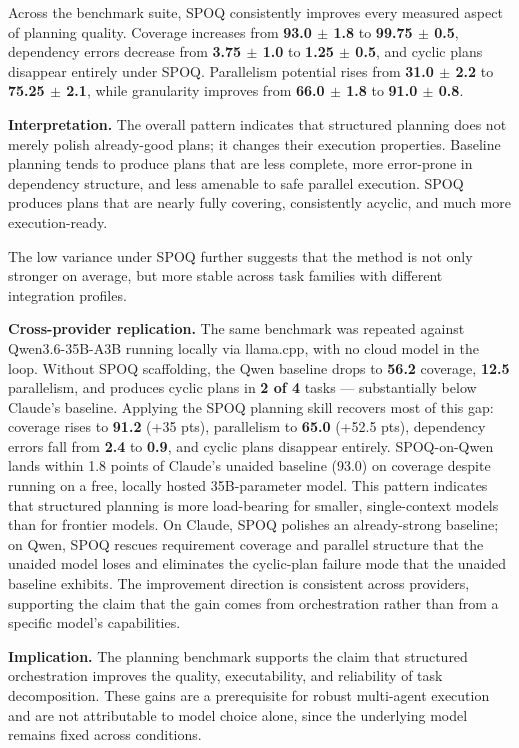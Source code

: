 Across the benchmark suite, SPOQ consistently improves every measured aspect of planning quality. Coverage increases from \textbf{93.0 $\pm$ 1.8} to \textbf{99.75 $\pm$ 0.5}, dependency errors decrease from \textbf{3.75 $\pm$ 1.0} to \textbf{1.25 $\pm$ 0.5}, and cyclic plans disappear entirely under SPOQ. Parallelism potential rises from \textbf{31.0 $\pm$ 2.2} to \textbf{75.25 $\pm$ 2.1}, while granularity improves from \textbf{66.0 $\pm$ 1.8} to \textbf{91.0 $\pm$ 0.8}.

\textbf{Interpretation.}
The overall pattern indicates that structured planning does not merely polish already-good plans; it changes their execution properties. Baseline planning tends to produce plans that are less complete, more error-prone in dependency structure, and less amenable to safe parallel execution. SPOQ produces plans that are nearly fully covering, consistently acyclic, and much more execution-ready.

The low variance under SPOQ further suggests that the method is not only stronger on average, but more stable across task families with different integration profiles.

\textbf{Cross-provider replication.}
The same benchmark was repeated against Qwen3.6-35B-A3B running locally via llama.cpp, with no cloud model in the loop. Without SPOQ scaffolding, the Qwen baseline drops to \textbf{56.2} coverage, \textbf{12.5} parallelism, and produces cyclic plans in \textbf{2 of 4} tasks --- substantially below Claude's baseline. Applying the SPOQ planning skill recovers most of this gap: coverage rises to \textbf{91.2} (+35 pts), parallelism to \textbf{65.0} (+52.5 pts), dependency errors fall from \textbf{2.4} to \textbf{0.9}, and cyclic plans disappear entirely. SPOQ-on-Qwen lands within 1.8 points of Claude's unaided baseline (93.0) on coverage despite running on a free, locally hosted 35B-parameter model. This pattern indicates that structured planning is more load-bearing for smaller, single-context models than for frontier models. On Claude, SPOQ polishes an already-strong baseline; on Qwen, SPOQ rescues requirement coverage and parallel structure that the unaided model loses and eliminates the cyclic-plan failure mode that the unaided baseline exhibits. The improvement direction is consistent across providers, supporting the claim that the gain comes from orchestration rather than from a specific model's capabilities.

\textbf{Implication.}
The planning benchmark supports the claim that structured orchestration improves the quality, executability, and reliability of task decomposition. These gains are a prerequisite for robust multi-agent execution and are not attributable to model choice alone, since the underlying model remains fixed across conditions.

